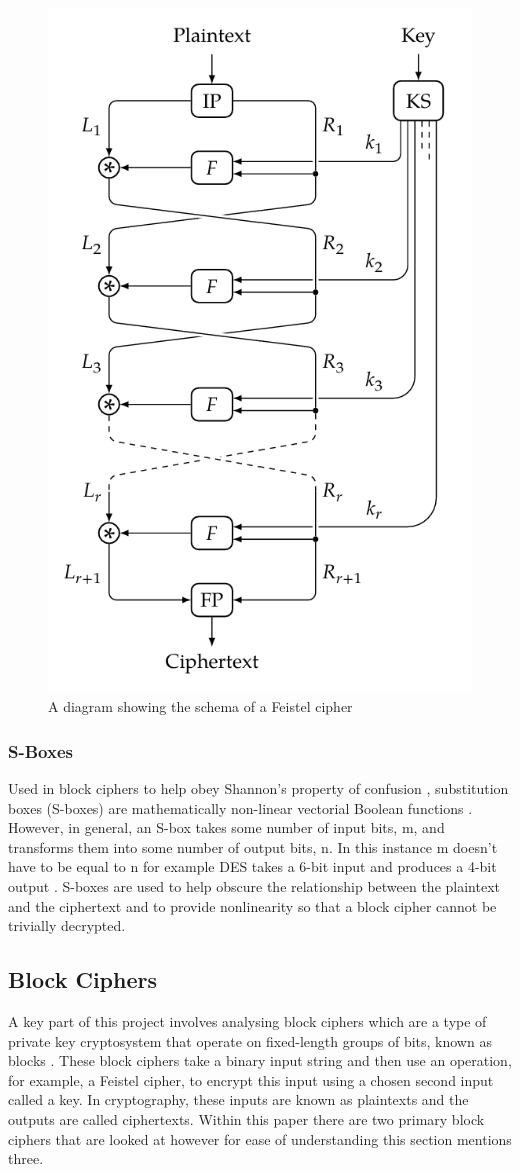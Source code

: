\documentclass[10pt,journal,compsoc]{IEEEtran}
\begin{document}
\begin{figure}[hbt!]
    \centering
    \includegraphics[width=0.5\linewidth]{Figures/fn.png}
    \caption{A diagram showing the schema of a Feistel cipher \cite{cryptoeprint:2016/1171-141-29}}
    \label{fig:fn}
\end{figure}
 

\subsubsection{S-Boxes}
Used in block ciphers to help obey Shannon’s property of confusion \cite{Anderson2008}, substitution boxes (S-boxes) are mathematically non-linear vectorial Boolean functions \cite{Carlet_2010}. However, in general, an S-box takes some number of input bits, m, and transforms them into some number of output bits, n. In this instance m doesn’t have to be equal to n for example DES takes a 6-bit input and produces a 4-bit output \cite{5389567}. S-boxes are used to help obscure the relationship between the plaintext and the ciphertext and to provide nonlinearity so that a block cipher cannot be trivially decrypted.

\subsection{Block Ciphers}
A key part of this project involves analysing block ciphers which are a type of private key cryptosystem that operate on fixed-length groups of bits, known as blocks \cite{cryptoeprint:2016/1171}. These block ciphers take a binary input string and then use an operation, for example, a Feistel cipher, to encrypt this input using a chosen second input called a key. In cryptography, these inputs are known as plaintexts and the outputs are called ciphertexts. Within this paper there are two primary block ciphers that are looked at however for ease of understanding this section mentions three.
\end{document}

